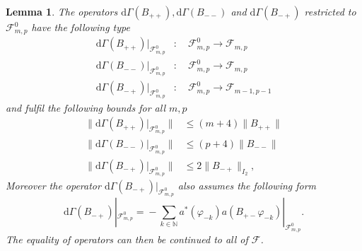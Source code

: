 \documentclass[b5paper,draft,openbib,12pt]{memoir}
\newtheorem{Lemma}[Def]{Lemma}
\begin{document}
\begin{Lemma}\label{d Gamma norms}
The operators 
\(\mathrm{d}\Gamma(B_{++}),\mathrm{d}\Gamma(B_{--})\) and 
\(\mathrm{d}\Gamma(B_{-+})\) 
restricted to \(\mathcal{F}^0_{m,p}\) have the following 
type
\begin{align}
\mathrm{d}\Gamma(B_{++})|_{\mathcal{F}^0_{m,p}}&: \quad \mathcal{F}^0_{m,p} \rightarrow \mathcal{F}_{m,p}\\
\mathrm{d}\Gamma(B_{--})|_{\mathcal{F}^0_{m,p}}&: \quad \mathcal{F}^0_{m,p} \rightarrow \mathcal{F}_{m,p}\\
\mathrm{d}\Gamma(B_{-+})|_{\mathcal{F}^0_{m,p}}&: \quad \mathcal{F}^0_{m,p} \rightarrow \mathcal{F}_{m-1,p-1}
\end{align}
 and fulfil
the following bounds for all \(m,p\)
\begin{align}
\|\mathrm{d}\Gamma(B_{++})|_{\mathcal{F}^0_{m,p}}\|&\le (m+4)\|B_{++}\|\\
\|\mathrm{d}\Gamma(B_{--})|_{\mathcal{F}^0_{m,p}}\|&\le (p+4)\|B_{--}\|\\
\|\mathrm{d}\Gamma(B_{-+})|_{\mathcal{F}^0_{m,p}}\|&\le 2 \|B_{-+}\|_{I_2},
\end{align}
Moreover the operator \(\mathrm{d}\Gamma(B_{-+})|_{\mathcal{F}^0_{m,p}}\)
also assumes the following form
\begin{equation}\label{dGamma form for adjoint}
  \mathrm{d}\Gamma(B_{-+})|_{\mathcal{F}^0_{m,p}}=\!-\!\sum_{k\in\mathbb{N}}a^*(\varphi_{-k})a(B_{+-}\varphi_{-k})|_{\mathcal{F}^0_{m,p}}.
\end{equation}
The equality of operators can then be continued to all of \(\mathcal{F}\).
\end{Lemma}
\end{document}
